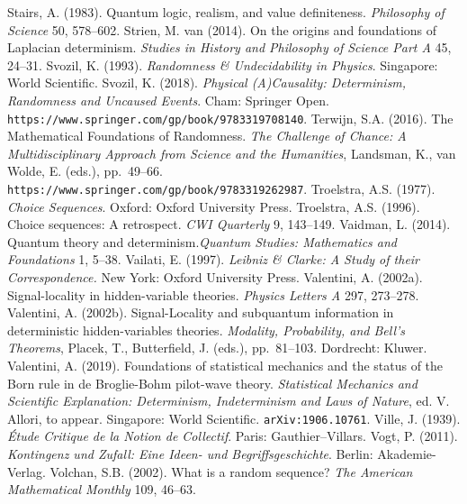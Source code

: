 \documentclass[11pt,a4paper]{article}
\numberwithin{equation}{section}
\begin{document}
\begin{small}
\begin{thebibliography}{99}
  \bibitem{}
 Stairs, A. (1983).
 Quantum logic, realism, and value definiteness. \emph{Philosophy of Science} 50, 578--602. 
       \bibitem{}  Strien, M. van (2014). On the origins and foundations of Laplacian determinism.
       \emph{Studies in History and
 Philosophy of Science Part A} 45, 24--31.
  \bibitem{}  Svozil, K. (1993). \emph{Randomness \& Undecidability in Physics}. Singapore: World Scientific. 
   \bibitem{}  Svozil, K. (2018). \emph{Physical (A)Causality:
Determinism, Randomness and Uncaused Events}. Cham: Springer Open.  \verb#https://www.springer.com/gp/book/9783319708140#. 
 \bibitem{}  Terwijn, S.A. (2016). The Mathematical Foundations of Randomness. 
 \emph{The Challenge of Chance: A Multidisciplinary Approach from Science and the Humanities},   Landsman, K., van Wolde, E. (eds.),  pp.\ 49--66.  \verb#https://www.springer.com/gp/book/9783319262987#.
   \bibitem{}  Troelstra, A.S. (1977). \emph{Choice Sequences}. Oxford: Oxford University Press. 
  \bibitem{}  Troelstra, A.S. (1996). Choice sequences: A retrospect. \emph{CWI Quarterly} 9, 143--149.
  \bibitem{} Vaidman, L. (2014). Quantum theory and determinism.\emph{Quantum Studies: Mathematics and Foundations}
  1, 5--38. 
     \bibitem{} Vailati, E. (1997). \emph{Leibniz \& Clarke: A Study of their Correspondence.} New York: Oxford University Press. 
           \bibitem{}  Valentini, A. (2002a). Signal-locality in hidden-variable theories. \emph{Physics Letters A} 297, 273--278.  
    \bibitem{}  Valentini, A. (2002b).       Signal-Locality and subquantum information in deterministic hidden-variables theories. \emph{Modality, Probability, and Bell's Theorems}, Placek, T.,  Butterfield, J. (eds.), pp.\ 81--103.
Dordrecht: Kluwer. 
   \bibitem{} Valentini, A. (2019). Foundations of statistical mechanics and the status of the Born rule in de Broglie-Bohm pilot-wave theory. \emph{Statistical Mechanics and Scientific Explanation: Determinism, Indeterminism and Laws of Nature}, ed. V. Allori, to appear.  Singapore: World Scientific. \verb#arXiv:1906.10761#.  
     \bibitem{}  Ville, J. (1939). \emph{\'{E}tude Critique de la Notion de Collectif}. Paris: Gauthier--Villars.        
  \bibitem{}  Vogt, P. (2011). \emph{Kontingenz und Zufall: Eine Ideen- und Begriffsgeschichte}. Berlin: Akademie-Verlag. 
      \bibitem{} Volchan, S.B. (2002). What is a random sequence? \emph{The American Mathematical Monthly} 109, 46--63.
   \bibitem{}

\end{thebibliography}
\end{small}
\end{document}
